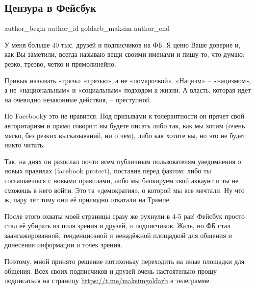  
 
 
 
 
 
\subsection{Цензура в Фейсбук}
\label{sec:15_12_2021.fb.goldarb_maksim.1.cenzura_facebook}
 
\ifcmt
 author_begin
   author_id goldarb_maksim
 author_end
\fi

У меня больше 40 тыс. друзей и подписчиков на ФБ. Я ценю Ваше доверие и, как Вы
заметили, всегда называю вещи своими именами и пишу то, что думаю: резко,
трезво, четко и прямолинейно. 

Привык называть «грязь» «грязью», а не «помарочкой». «Нацизм» – «нацизмом», а
не «национальным» и «социальным» подходом к жизни. А власть, которая идет на
очевидно незаконные действия, – преступной. 


Но Facebookу это не нравится. Под призывами к толерантности он прячет свой
авторитаризм и прямо говорит: вы будете писать либо так, как мы хотим (очень
мягко, без резких высказываний, ни о чем), либо как хотите вы, но это не будет
никто читать. 

Так, на днях он разослал почти всем публичным пользователям уведомления о новых
правилах (facebook protect), поставив перед фактом: либо ты соглашаешься с
новыми правилами, либо мы блокируем твой аккаунт и ты не сможешь в него войти.
Это та «демократия», о которой мы все мечтали. Ну что ж, пару лет тому они её
прилюдно откатали на Трампе. 

После этого охваты моей страницы сразу же рухнули в 4-5 раз! Фейсбук просто
стал её убирать из поля зрения и друзей, и подписчиков. Жаль, но ФБ стал
заангажированной, тенденциозной и ненадёжной площадкой для общения и донесения
информации и точек зрения. 

Поэтому, мной принято решение потихоньку переходить на иные площадки для
общения. Всех своих подписчиков и друзей очень настоятельно прошу подписаться
на страницу \url{https://t.me/maksimgoldarb} в телеграмме.  

